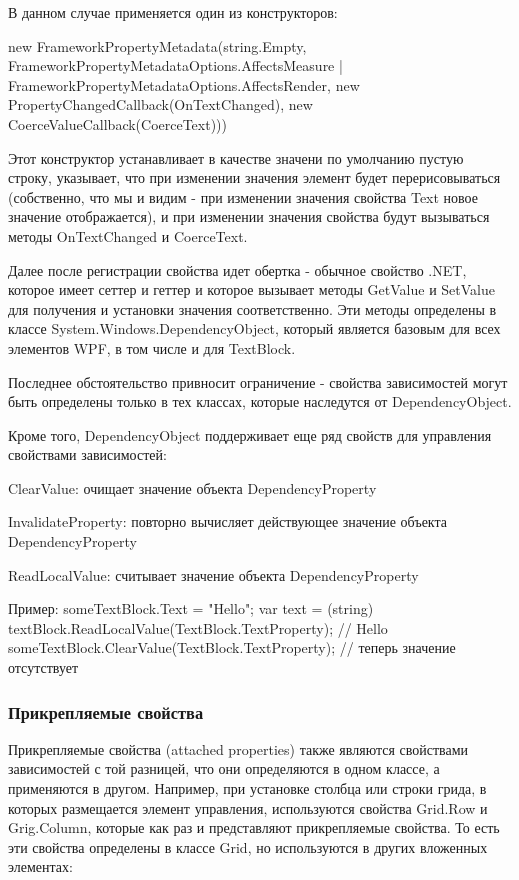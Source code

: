 В данном случае применяется один из конструкторов:

new FrameworkPropertyMetadata(string.Empty, 
    FrameworkPropertyMetadataOptions.AffectsMeasure | FrameworkPropertyMetadataOptions.AffectsRender, 
    new PropertyChangedCallback(OnTextChanged), new CoerceValueCallback(CoerceText)))
    
Этот конструктор устанавливает в качестве значени по умолчанию пустую строку, указывает, что при изменении значения элемент будет перерисовываться (собственно, что мы и видим - при изменении значения свойства Text новое значение отображается), и при изменении значения свойства будут вызываться методы OnTextChanged и CoerceText.

Далее после регистрации свойства идет обертка - обычное свойство .NET, которое имеет сеттер и геттер и которое вызывает методы GetValue и SetValue для получения и установки значения соответственно. Эти методы определены в классе System.Windows.DependencyObject, который является базовым для всех элементов WPF, в том числе и для TextBlock.

Последнее обстоятельство привносит ограничение - свойства зависимостей могут быть определены только в тех классах, которые наследутся от DependencyObject.

Кроме того, DependencyObject поддерживает еще ряд свойств для управления свойствами зависимостей:

ClearValue: очищает значение объекта DependencyProperty

InvalidateProperty: повторно вычисляет действующее значение объекта DependencyProperty

ReadLocalValue: считывает значение объекта DependencyProperty

Пример:
someTextBlock.Text = "Hello";
var text = (string) textBlock.ReadLocalValue(TextBlock.TextProperty); // Hello
someTextBlock.ClearValue(TextBlock.TextProperty); // теперь значение отсутствует


\subsubsection{Прикрепляемые свойства}

Прикрепляемые свойства (attached properties) также являются свойствами зависимостей с той разницей, что они определяются в одном классе, а применяются в другом. Например, при установке столбца или строки грида, в которых размещается элемент управления, используются свойства Grid.Row и Grig.Column, которые как раз и представляют прикрепляемые свойства. То есть эти свойства определены в классе Grid, но используются в других вложенных элементах:

